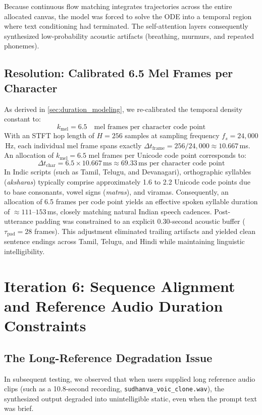 Because continuous flow matching integrates trajectories across the entire allocated canvas, the model was forced to solve the ODE into a temporal region where text conditioning had terminated. The self-attention layers consequently synthesized low-probability acoustic artifacts (breathing, murmurs, and repeated phonemes).

\subsection{Resolution: Calibrated 6.5 Mel Frames per Character}
As derived in \cref{sec:duration_modeling}, we re-calibrated the temporal density constant to:
\begin{equation}
    k_{\text{mel}} = 6.5 \quad \text{mel frames per character code point}
\end{equation}
With an STFT hop length of $H = 256$ samples at sampling frequency $f_s = 24{,}000$\,Hz, each individual mel frame spans exactly $\Delta t_{\text{frame}} = 256 / 24{,}000 \approx 10.667$\,ms. An allocation of $k_{\text{mel}} = 6.5$ mel frames per Unicode code point corresponds to:
\begin{equation}
    \Delta t_{\text{char}} = 6.5 \times 10.667\,\text{ms} \approx 69.33\,\text{ms per character code point}
\end{equation}
In Indic scripts (such as Tamil, Telugu, and Devanagari), orthographic syllables (\textit{aksharas}) typically comprise approximately 1.6 to 2.2 Unicode code points due to base consonants, vowel signs (\textit{matras}), and viramas. Consequently, an allocation of 6.5 frames per code point yields an effective spoken syllable duration of $\approx 111\text{--}153$\,ms, closely matching natural Indian speech cadences. Post-utterance padding was constrained to an explicit 0.30-second acoustic buffer ($\tau_{\text{pad}} = 28$ frames). This adjustment eliminated trailing artifacts and yielded clean sentence endings across Tamil, Telugu, and Hindi while maintaining linguistic intelligibility.

\section{Iteration 6: Sequence Alignment and Reference Audio Duration Constraints}
\subsection{The Long-Reference Degradation Issue}
In subsequent testing, we observed that when users supplied long reference audio clips (such as a 10.8-second recording, \texttt{sudhanva\_voic\_clone.wav}), the synthesized output degraded into unintelligible static, even when the prompt text was brief.

